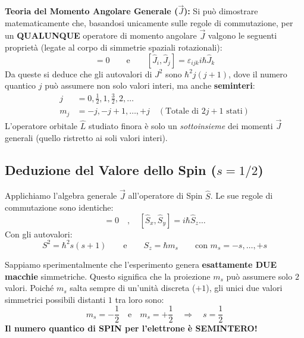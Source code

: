 \documentclass[11pt, a4paper]{article}
\begin{document}
\noindent
\textbf{Teoria del Momento Angolare Generale ($\vec{J}$):} %
Si può dimostrare matematicamente che, basandosi unicamente sulle regole di commutazione, per un \textbf{QUALUNQUE} operatore di momento angolare $\vec{J}$ valgono le seguenti proprietà (legate al corpo di simmetrie spaziali rotazionali): %
\begin{equation}
    [\hat{J}^2, \hat{J}_i] = 0 \qquad \text{e} \qquad [\hat{J}_i, \hat{J}_j] = \varepsilon_{ijk} i\hbar \hat{J}_k %
\end{equation}
Da queste si deduce che gli autovalori di $J^2$ sono $\hbar^2 j(j+1)$, dove il numero quantico $j$ può assumere non solo valori interi, ma anche \textbf{seminteri}: %
\begin{align*}
    j &= 0, \frac{1}{2}, 1, \frac{3}{2}, 2, \dots \\ %
    m_j &= -j, -j+1, \dots, +j \quad (\text{Totale di } 2j+1 \text{ stati}) %
\end{align*}
L'operatore orbitale $\hat{L}$ studiato finora è solo un \textit{sottoinsieme} dei momenti $\vec{J}$ generali (quello ristretto ai soli valori interi). %

\subsection{Deduzione del Valore dello Spin ($s=1/2$)} %

Applichiamo l'algebra generale $\vec{J}$ all'operatore di Spin $\hat{S}$. Le sue regole di commutazione sono identiche: %
\begin{equation*}
    [\hat{S}^2, \hat{S}_z] = 0 \quad , \quad [\hat{S}_x, \hat{S}_y] = i\hbar \hat{S}_z \dots %
\end{equation*}
Con gli autovalori: %
\begin{equation}
    S^2 = \hbar^2 s(s+1) \qquad \text{e} \qquad S_z = \hbar m_s \qquad \text{con } m_s = -s, \dots, +s %
\end{equation}

\noindent
Sappiamo sperimentalmente che l'esperimento genera \textbf{esattamente DUE macchie} simmetriche. Questo significa che la proiezione $m_s$ può assumere solo $2$ valori. %
Poiché $m_s$ salta sempre di un'unità discreta ($+1$), gli unici due valori simmetrici possibili distanti $1$ tra loro sono: %
\begin{equation*}
    m_s = -\frac{1}{2} \quad \text{e} \quad m_s = +\frac{1}{2} \quad \Rightarrow \quad s = \frac{1}{2} %
\end{equation*}
\textbf{Il numero quantico di SPIN per l'elettrone è SEMINTERO!} %
\end{document}
